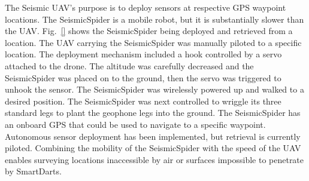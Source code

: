 The Seismic UAV's purpose is to deploy sensors at respective GPS waypoint locations. The SeismicSpider is a mobile robot, but it is substantially slower than the UAV. Fig.~\ref{} shows the SeismicSpider being deployed and retrieved from a location. The UAV carrying the SeismicSpider was manually piloted to a specific location. The deployment mechanism included a hook controlled by a servo attached to the drone. The altitude was carefully decreased and the SeismicSpider was placed on to the ground, then the servo was triggered to unhook the sensor.  The SeismicSpider was wirelessly powered up and walked to a desired position. The SeismicSpider was next controlled to wriggle its three standard legs to plant the geophone legs into the ground.  The SeismicSpider has an onboard GPS that could be used to navigate to a specific waypoint.  Autonomous sensor deployment has been implemented, but retrieval is currently piloted.  Combining the mobility of the SeismicSpider with the speed of the UAV enables surveying locations inaccessible by air or surfaces impossible to penetrate by SmartDarts.



